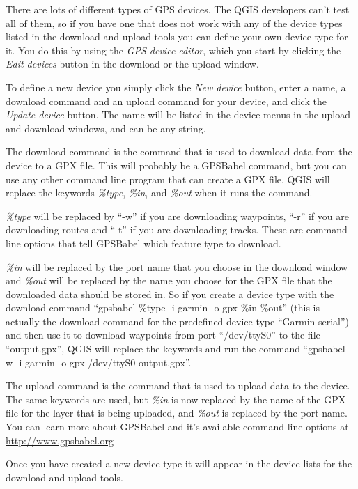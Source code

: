 There are lots of different types of GPS devices. The QGIS developers
can't test all of them, so if you have one that does not work with
any of the device types listed in the download and upload tools you
can define your own device type for it. You do this by using the \emph{GPS
device editor}, which you start by clicking the \emph{Edit devices}
button in the download or the upload window.

To define a new device you simply click the \emph{New device} button,
enter a name, a download command and an upload command for your device,
and click the \emph{Update device} button. The name will be listed in the
device menus in the upload and download windows, and can be any string.

The download command is the command that is used to download data
from the device to a GPX file. This will probably be a GPSBabel command,
but you can use any other command line program that can create a GPX
file. QGIS will replace the keywords \emph{\%type}, \emph{\%in}, and
\emph{\%out} when it runs the command.

\emph{\%type} will be replaced by {}``-w'' if you are downloading
waypoints, {}``-r'' if you are downloading routes and {}``-t''
if you are downloading tracks. These are command line options that
tell GPSBabel which feature type to download.

\emph{\%in} will be replaced by the port name that you choose in the
download window and \emph{\%out} will be replaced by the name you
choose for the GPX file that the downloaded data should be stored
in. So if you create a device type with the download command {}``gpsbabel
\%type -i garmin -o gpx \%in \%out'' (this is actually the download
command for the predefined device type {}``Garmin serial'') and
then use it to download waypoints from port {}``/dev/ttyS0'' to
the file {}``output.gpx'', QGIS will replace the keywords and run
the command {}``gpsbabel -w -i garmin -o gpx /dev/ttyS0 output.gpx''.

The upload command is the command that is used to upload data to the
device. The same keywords are used, but \emph{\%in} is now replaced
by the name of the GPX file for the layer that is being uploaded,
and \emph{\%out} is replaced by the port name. You can learn more
about GPSBabel and it's available command line options at
\url{http://www.gpsbabel.org}

Once you have created a new device type it will appear in the device
lists for the download and upload tools.
